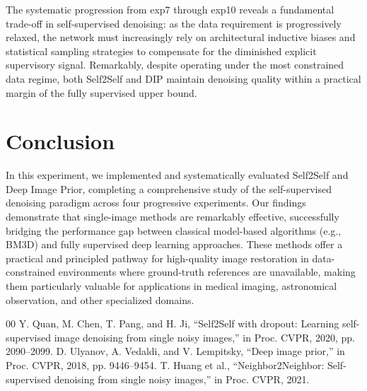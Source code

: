 \documentclass[twocolumn, a4paper, 10pt]{article}
\begin{document}
The systematic progression from exp7 through exp10 reveals a fundamental trade-off in self-supervised denoising: as the data requirement is progressively relaxed, the network must increasingly rely on architectural inductive biases and statistical sampling strategies to compensate for the diminished explicit supervisory signal. Remarkably, despite operating under the most constrained data regime, both Self2Self and DIP maintain denoising quality within a practical margin of the fully supervised upper bound.

\section{Conclusion}

In this experiment, we implemented and systematically evaluated Self2Self and Deep Image Prior, completing a comprehensive study of the self-supervised denoising paradigm across four progressive experiments. Our findings demonstrate that single-image methods are remarkably effective, successfully bridging the performance gap between classical model-based algorithms (e.g., BM3D) and fully supervised deep learning approaches. These methods offer a practical and principled pathway for high-quality image restoration in data-constrained environments where ground-truth references are unavailable, making them particularly valuable for applications in medical imaging, astronomical observation, and other specialized domains.

\begin{thebibliography}{00}
 Y. Quan, M. Chen, T. Pang, and H. Ji, ``Self2Self with dropout: Learning self-supervised image denoising from single noisy images,'' in Proc. CVPR, 2020, pp. 2090--2099.
 D. Ulyanov, A. Vedaldi, and V. Lempitsky, ``Deep image prior,'' in Proc. CVPR, 2018, pp. 9446--9454.
 T. Huang et al., ``Neighbor2Neighbor: Self-supervised denoising from single noisy images,'' in Proc. CVPR, 2021.
\end{thebibliography}
\end{document}
